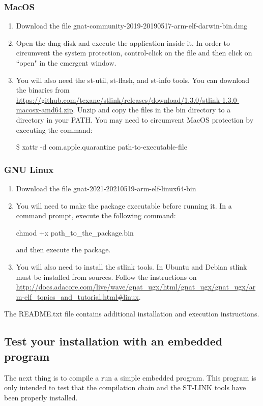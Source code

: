\subsubsection*{MacOS}
\begin{enumerate}
\item Download the file gnat-community-2019-20190517-arm-elf-darwin-bin.dmg
\item Open the dmg disk and execute the application inside it. In order to circumvent the system protection, control-click on the file and then click on ``open" in the emergent window.
\item You will also need the st-util,  st-flash, and st-info tools. You can download the binaries from 
\url{https://github.com/texane/stlink/releases/download/1.3.0/stlink-1.3.0-macosx-amd64.zip}. Unzip and copy the files in the bin directory to a directory in your PATH. You may need to circumvent MacOS protection by executing the command:

	\$ xattr -d com.apple.quarantine path-to-executable-file
\end{enumerate}
\subsubsection*{GNU Linux}
\begin{enumerate}
\item Download the file gnat-2021-20210519-arm-elf-linux64-bin
\item You will need to make the package executable before running it. In a command prompt, execute the following command:

     chmod +x path\_to\_the\_package.bin

and then execute the package.
\item You will also need to install the stlink tools. In Ubuntu and Debian stlink must be installed from sources. Follow the instructions on \url{http://docs.adacore.com/live/wave/gnat\_ugx/html/gnat\_ugx/gnat\_ugx/arm-elf\_topics\_and\_tutorial.html\#linux}.
\end{enumerate}

The README.txt file contains additional installation and execution instructions.

\subsection{Test your installation with an embedded program}

The next thing is to compile a run a simple embedded program. This program is only intended to test that the compilation chain and the ST-LINK tools have been properly installed.


